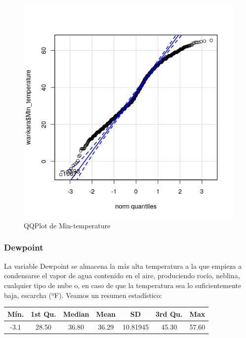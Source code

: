 \begin{figure}[H] %
	\centering
	\includegraphics[scale=0.7]{qq-min-temp.png}  %
	\caption{QQPlot de Min-temperature} 
	\label{fig:qq-min-temp}
\end{figure}


\subsubsection{Dewpoint}


La variable Dewpoint se almacena la más alta temperatura a la que empieza a condensarse el vapor de agua contenido en el aire, produciendo rocío, neblina, cualquier tipo de nube o, en caso de que la temperatura sea lo suficientemente baja, escarcha (ºF). Veamos un resumen estadístico:

\begin{table}[H]
	\centering
	\begin{tabular}{|c|c|c|c|c|c|c|}
		\hline
		Mín. & 1st Qu. & Median & Mean  & SD       & 3rd Qu. & Max   \\ \hline
		-3.1 & 28.50   & 36.80  & 36.29 & 10.81945 & 45.30   & 57.60 \\ \hline
	\end{tabular}
\end{table}

